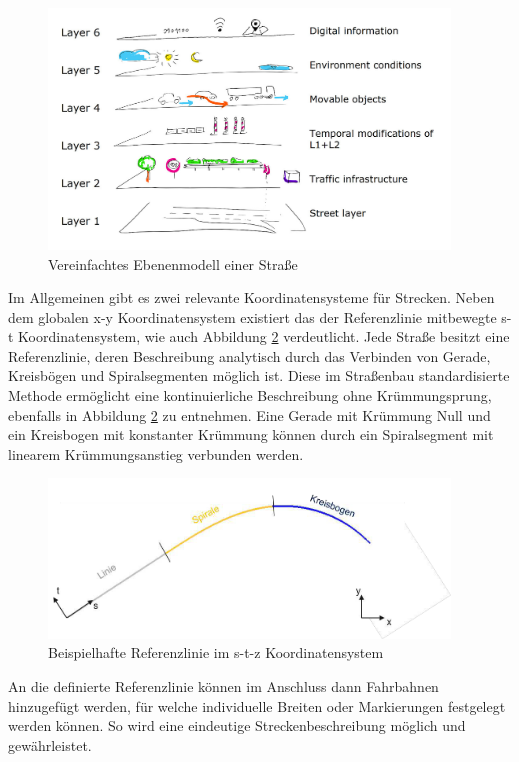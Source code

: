 \begin{figure}[H]
\flushleft
\includegraphics[width=0.95\textwidth]{fig/fig1.png}
\caption{Vereinfachtes Ebenenmodell einer Straße \cite{eckstein.2018}}
\label{abb1}
\end{figure}

Im Allgemeinen gibt es zwei relevante Koordinatensysteme für Strecken. Neben dem globalen x-y Koordinatensystem existiert das der Referenzlinie mitbewegte s-t Koordinatensystem, wie auch Abbildung \ref{abb2} verdeutlicht. Jede Straße besitzt eine Referenzlinie, deren Beschreibung analytisch durch das Verbinden von Gerade, Kreisbögen und Spiralsegmenten möglich ist. Diese im Straßenbau standardisierte Methode ermöglicht eine kontinuierliche Beschreibung ohne Krümmungsprung, ebenfalls in Abbildung \ref{abb2} zu entnehmen. Eine Gerade mit Krümmung Null und ein Kreisbogen mit konstanter Krümmung können durch ein Spiralsegment mit linearem Krümmungsanstieg verbunden werden.

\begin{figure}[H]
\flushleft
\includegraphics[width=0.95\textwidth]{fig/fig2.png}
\caption{Beispielhafte Referenzlinie im s-t-z Koordinatensystem \cite{Becker.2017}}
\label{abb2}
\end{figure}

An die definierte Referenzlinie können im Anschluss dann Fahrbahnen hinzugefügt werden, für welche individuelle Breiten oder Markierungen festgelegt werden können. So wird eine eindeutige Streckenbeschreibung möglich und gewährleistet.

